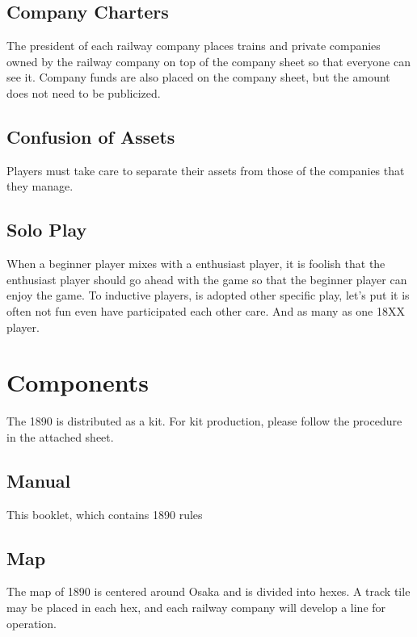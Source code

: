 \documentclass{article}
\begin{document}
\begin{CJK}{UTF8}{min}
\begin{multicols}{2}
\subsection{Company Charters}
\label{company-charters}
The president of each railway company places trains and private
companies owned by the railway company on top of the company sheet so
that everyone can see it. Company funds are also placed on the company
sheet, but the amount does not need to be publicized.


\subsection{Confusion of Assets}
Players must take care to separate their assets from those of the
companies that they manage.


\subsection{Solo Play}
When a beginner player mixes with a enthusiast player, it is foolish
that the enthusiast player should go ahead with the game so that the
 beginner player can enjoy the game. To inductive players, is adopted
other specific play, let's put it is often not fun even have
participated each other care. And as many as one 18XX player.

\section{Components}
The 1890 is distributed as a kit. For kit production, please follow
the procedure in the attached sheet.

\subsection{Manual}
This booklet, which contains 1890 rules

\subsection{Map}
The map of 1890 is centered around Osaka and is divided into
hexes. A track tile may be placed in each hex, and each
railway company will develop a line for operation.


\end{multicols}
\end{CJK}
\end{document}
